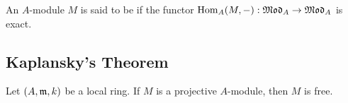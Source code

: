 \begin{definition}
    An $A$-module $M$ is said to be  if the functor $\operatorname{Hom}_A(M,-):\mathfrak{Mod}_A\to\mathfrak{Mod}_A$ is exact.
\end{definition}

\subsection{Kaplansky's Theorem}

\begin{theorem}
    Let $(A,\mathfrak{m},k)$ be a local ring. If $M$ is a projective $A$-module, then $M$ is free.
\end{theorem}